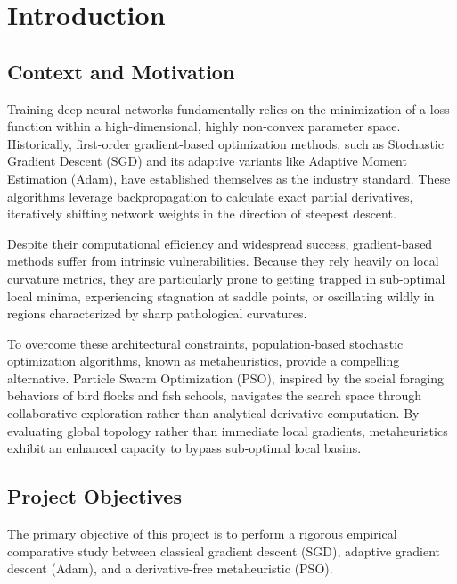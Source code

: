 \documentclass[12pt, a4paper]{article}
\begin{document}
\newpage
{}
\tableofcontents
\newpage

\section{Introduction}

\subsection{Context and Motivation}
Training deep neural networks fundamentally relies on the minimization of a loss function within a high-dimensional, highly non-convex parameter space. Historically, first-order gradient-based optimization methods, such as Stochastic Gradient Descent (SGD) and its adaptive variants like Adaptive Moment Estimation (Adam), have established themselves as the industry standard. These algorithms leverage backpropagation to calculate exact partial derivatives, iteratively shifting network weights in the direction of steepest descent. 

Despite their computational efficiency and widespread success, gradient-based methods suffer from intrinsic vulnerabilities. Because they rely heavily on local curvature metrics, they are particularly prone to getting trapped in sub-optimal local minima, experiencing stagnation at saddle points, or oscillating wildly in regions characterized by sharp pathological curvatures. 

To overcome these architectural constraints, population-based stochastic optimization algorithms, known as metaheuristics, provide a compelling alternative. Particle Swarm Optimization (PSO), inspired by the social foraging behaviors of bird flocks and fish schools, navigates the search space through collaborative exploration rather than analytical derivative computation. By evaluating global topology rather than immediate local gradients, metaheuristics exhibit an enhanced capacity to bypass sub-optimal local basins.

\subsection{Project Objectives}
The primary objective of this project is to perform a rigorous empirical comparative study between classical gradient descent (SGD), adaptive gradient descent (Adam), and a derivative-free metaheuristic (PSO). 
\end{document}
